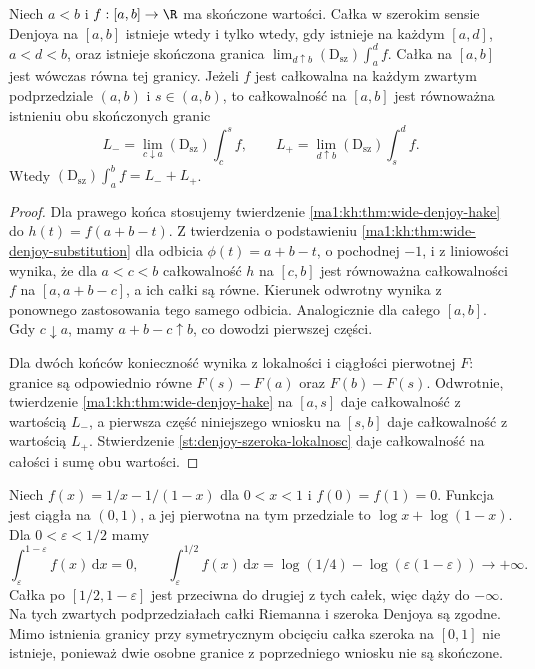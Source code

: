 \begin{wniosek}
\label{it:cor:wide-denjoy-hake-two-endpoints}
Niech $a<b$ i $f:[a,b]\to\R$ ma skończone wartości.
Całka w szerokim sensie Denjoya na $[a,b]$ istnieje wtedy
i tylko wtedy, gdy istnieje na każdym $[a,d]$, $a<d<b$,
oraz istnieje skończona granica
$\lim_{d\uparrow b}(\mathrm D_{\mathrm{sz}})\int_a^d f$.
Całka na $[a,b]$ jest wówczas równa tej granicy.
Jeżeli $f$ jest całkowalna na każdym zwartym podprzedziale
$(a,b)$ i $s\in(a,b)$, to całkowalność na $[a,b]$
jest równoważna istnieniu obu skończonych granic
\[
 L_-=\lim_{c\downarrow a}(\mathrm D_{\mathrm{sz}})\int_c^s f,
 \qquad
 L_+=\lim_{d\uparrow b}(\mathrm D_{\mathrm{sz}})\int_s^d f.
\]
Wtedy $(\mathrm D_{\mathrm{sz}})\int_a^b f=L_-+L_+$.
\end{wniosek}
\begin{proof}
Dla prawego końca stosujemy twierdzenie
\ref{ma1:kh:thm:wide-denjoy-hake} do $h(t)=f(a+b-t)$.
Z twierdzenia o podstawieniu
\ref{ma1:kh:thm:wide-denjoy-substitution} dla odbicia
$\phi(t)=a+b-t$, o pochodnej $-1$, i z liniowości
wynika, że dla $a<c<b$ całkowalność $h$ na $[c,b]$
jest równoważna całkowalności $f$ na $[a,a+b-c]$,
a ich całki są równe. Kierunek odwrotny wynika
z ponownego zastosowania tego samego odbicia.
Analogicznie dla całego $[a,b]$.
Gdy $c\downarrow a$, mamy $a+b-c\uparrow b$,
co dowodzi pierwszej części.

Dla dwóch końców konieczność wynika z lokalności
i ciągłości pierwotnej $F$: granice są odpowiednio
równe $F(s)-F(a)$ oraz $F(b)-F(s)$.
Odwrotnie, twierdzenie \ref{ma1:kh:thm:wide-denjoy-hake}
na $[a,s]$ daje całkowalność z wartością $L_-$,
a pierwsza część niniejszego wniosku na $[s,b]$
daje całkowalność z wartością $L_+$.
Stwierdzenie \ref{st:denjoy-szeroka-lokalnosc}
daje całkowalność na całości i sumę obu wartości.
\end{proof}
\begin{uwaga}
Niech $f(x)=1/x-1/(1-x)$ dla $0<x<1$ i $f(0)=f(1)=0$.
Funkcja jest ciągła na $(0,1)$, a jej pierwotna na
tym przedziale to $\log x+\log(1-x)$.
Dla $0<\varepsilon<1/2$ mamy
\[
 \int_\varepsilon^{1-\varepsilon} f(x)\,\mathrm dx=0,
 \qquad
 \int_\varepsilon^{1/2}f(x)\,\mathrm dx
 =\log(1/4)-\log(\varepsilon(1-\varepsilon))
 \longrightarrow+\infty.
\]
Całka po $[1/2,1-\varepsilon]$ jest przeciwna do
drugiej z tych całek, więc dąży do $-\infty$.
Na tych zwartych podprzedziałach całki Riemanna
i szeroka Denjoya są zgodne.
Mimo istnienia granicy przy symetrycznym obcięciu
całka szeroka na $[0,1]$ nie istnieje, ponieważ
dwie osobne granice z poprzedniego wniosku nie są skończone.
\end{uwaga}



